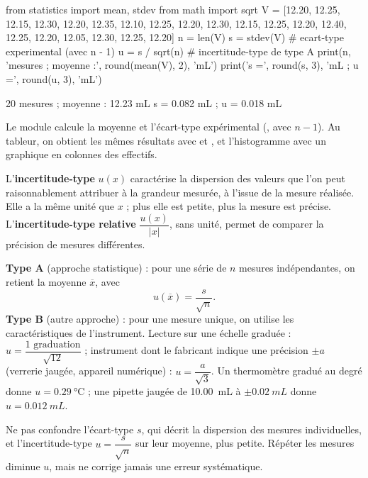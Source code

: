\par{}
\begin{python}
from statistics import mean, stdev
from math import sqrt
V = [12.20, 12.25, 12.15, 12.30, 12.20, 12.35, 12.10, 12.25, 12.20, 12.30,
     12.15, 12.25, 12.20, 12.40, 12.25, 12.20, 12.05, 12.30, 12.25, 12.20]
n = len(V)
s = stdev(V)                       # ecart-type experimental (avec n - 1)
u = s / sqrt(n)                    # incertitude-type de type A
print(n, 'mesures ; moyenne :', round(mean(V), 2), 'mL')
print('s =', round(s, 3), 'mL ; u =', round(u, 3), 'mL')
\end{python}
\begin{console}
20 mesures ; moyenne : 12.23 mL
s = 0.082 mL ; u = 0.018 mL
\end{console}
\noindent{} Le module  calcule la moyenne et l'écart-type expérimental (, avec $n-1$). Au tableur,
on obtient les mêmes résultats avec  et , et l'histogramme avec un graphique en colonnes des effectifs.
\begin{definition}
L'\textbf{incertitude-type} $u(x)$ caractérise la dispersion des valeurs que l'on peut raisonnablement attribuer à la grandeur mesurée, à
l'issue de la mesure réalisée. Elle a la même unité que $x$ ; plus elle est petite, plus la mesure est précise. L'\textbf{incertitude-type
relative} $\dfrac{u(x)}{|x|}$, sans unité, permet de comparer la précision de mesures différentes.
\end{definition}
\begin{loi}
\textbf{Type A} (approche statistique) : pour une série de $n$ mesures indépendantes, on retient la moyenne $\overline{x}$, avec
\[u(\overline{x})=\frac{s}{\sqrt{n}}.\]
\textbf{Type B} (autre approche) : pour une mesure unique, on utilise les caractéristiques de l'instrument. Lecture sur une échelle
graduée : $u=\dfrac{\text{1 graduation}}{\sqrt{12}}$ ; instrument dont le fabricant indique une précision $\pm a$ (verrerie jaugée, appareil
numérique) : $u=\dfrac{a}{\sqrt{3}}$. Un thermomètre gradué au degré donne $u=\qty{0,29}{\degreeCelsius}$ ; une pipette jaugée de \qty{10,00}{mL} à
$\pm\qty{0,02}{mL}$ donne $u=\qty{0,012}{mL}$.
\end{loi}
\begin{attention}
Ne pas confondre l'écart-type $s$, qui décrit la dispersion des mesures individuelles, et l'incertitude-type $u=\dfrac{s}{\sqrt{n}}$ sur leur
moyenne, plus petite. Répéter les mesures diminue $u$, mais ne corrige jamais une erreur systématique.
\end{attention}

